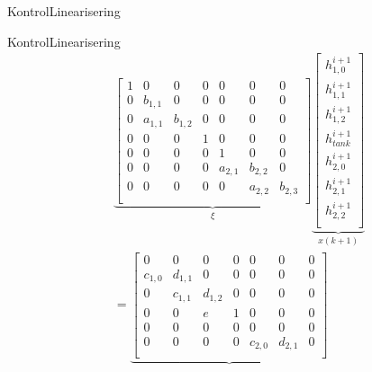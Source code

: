 \begin{frame}{Kontrol}{Linearisering}
\end{frame}
\begin{frame}{Kontrol}{Linearisering}
\begin{equation}\label{eq:tank_linear_implement_ss}
\begin{aligned}
      & \underbrace{\begin{bmatrix}
            1 & 0       & 0         &0          &0          &0   &0\\
            0 & b_{1,1} & 0         &0          &0          &0  &0\\
            0 &a_{1,1}  & b_{1,2}   & 0         &0          &0 &0\\
            0 &0        & 0         & 1         & 0         &0      &0\\
             0 &0        & 0         &  0        & 1         &0   & 0        \\
            0 & 0       &0          &  0         &a_{2,1}    &  b_{2,2}&0       \\
            0 & 0       & 0         &   0        &     0      & a_{2,2}  & b_{2,3}\\  
       \end{bmatrix}}_{\xi}
        \underbrace{\begin{bmatrix}
        h_{1,0}^{i+1}\\
        h_{1,1}^{i+1} \\
        h_{1,2}^{i+1} \\ 
        h_{tank}^{i+1} \\          
        h_{2,0}^{i+1}     \\
        h_{2,1}^{i+1}\\
        h_{2,2}^{i+1}\\
    \end{bmatrix}}_{x(k+1)}
    \\ &=
    \underbrace{\begin{bmatrix}
        0       &  0    &   0    & 0     &0         &0          &0 \\
        c_{1,0} &d_{1,1}&   0    &  0    &0         &0          &0\\
        0       &c_{1,1}& d_{1,2}& 0     &0         &0       &0\\
        0       & 0     & e    & 1     &0         &0          &0           \\
        0       & 0     &   0    & 0     & 0        &0          &0        \\
        0       & 0     &  0     & 0    &c_{2,0}    &  d_{2,1} &0  \\

\end{bmatrix}}
\end{aligned}
\end{equation}
\end{frame}
